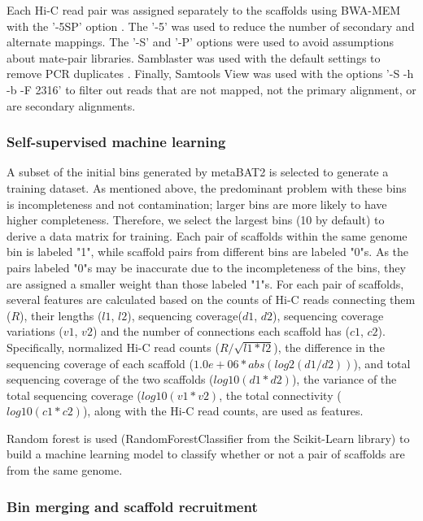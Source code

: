 \documentclass[fleqn,10pt,lineno]{wlpeerj}
\begin{document}
Each Hi-C read pair was assigned separately to the scaffolds using BWA-MEM with the '-5SP' option \citep{li2013aligning}. The '-5' was used to reduce the number of secondary and alternate mappings. The '-S' and '-P' options were used to avoid assumptions about mate-pair libraries. Samblaster was used with the default settings to remove PCR duplicates \citep{faust2014samblaster}. Finally, Samtools View was used with the options '-S -h -b -F 2316' to filter out reads that are not mapped, not the primary alignment, or are secondary alignments.  

\subsubsection*{Self-supervised machine learning}

A subset of the initial bins generated by metaBAT2 is selected to generate a training dataset. As mentioned above, the predominant problem with these bins is incompleteness and not contamination; larger bins are more likely to have higher completeness. Therefore, we select the largest bins (10 by default) to derive a data matrix for training. Each pair of scaffolds within the same genome bin is labeled "1", while scaffold pairs from different bins are labeled "0"s. As the pairs labeled "0"s may be inaccurate due to the incompleteness of the bins, they are assigned a smaller weight than those labeled "1"s.  For each pair of scaffolds, several features are calculated based on the counts of Hi-C reads connecting them ($R$), their lengths ($l1$, $l2$), sequencing coverage($d1$, $d2$), sequencing coverage variations ($v1$, $v2$) and the number of connections each scaffold has ($c1$, $c2$). Specifically, normalized Hi-C read counts ($R/\sqrt{l1*l2}$), the difference in the sequencing coverage of each scaffold ($1.0e+06*abs(log2(d1/d2))$), and total sequencing coverage of the two scaffolds ($log10(d1*d2)$), the variance of the total sequencing coverage ($log10(v1*v2)$, the total connectivity ($log10(c1*c2)$), along with the Hi-C read counts, are used as features. 

Random forest is used (RandomForestClassifier from the Scikit-Learn library) to build a machine learning model to classify whether or not a pair of scaffolds are from the same genome. 

\subsubsection*{Bin merging and scaffold recruitment}
\end{document}
